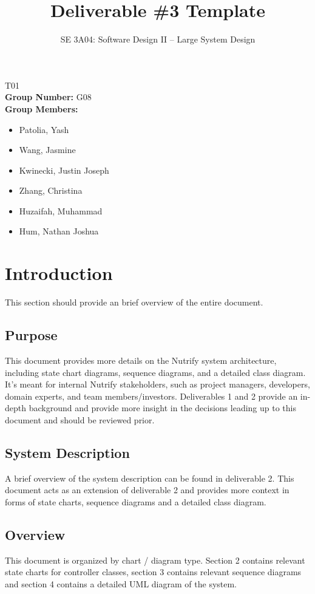 \documentclass[]{article}
\title{Deliverable \#3 Template}
\author{SE 3A04: Software Design II -- Large System Design}
\date{}
\numberwithin{figure}{section}
\begin{document}
\maketitle	
{} T01\\
{\bf Group Number:} G08 \\
{\bf Group Members:} 
\begin{itemize}
	\item Patolia, Yash
	\item Wang, Jasmine
	\item Kwinecki, Justin Joseph
	\item Zhang, Christina
	\item Huzaifah, Muhammad
	\item Hum, Nathan Joshua
\end{itemize}

\clearpage
\section{Introduction}
\label{sec:introduction}

This section should provide an brief overview of the entire document.

\subsection{Purpose}
\label{sub:purpose}
This document provides more details on the Nutrify system architecture, including state chart diagrams, sequence diagrams, and a detailed class diagram. It's meant for internal Nutrify stakeholders, such as project managers, developers, domain experts, and team members/investors.  Deliverables 1 and 2 provide an in-depth background and provide more insight in the decisions leading up to this document and should be reviewed prior.

\subsection{System Description}
\label{sub:system_description}
A brief overview of the system description can be found in deliverable 2. This document acts as an extension of deliverable 2 and provides more context in forms of state charts, sequence diagrams and a detailed class diagram.

\subsection{Overview}
\label{sub:overview}
This document is organized by chart / diagram type. Section 2 contains relevant state charts for controller classes, section 3 contains relevant sequence diagrams and section 4 contains a detailed UML diagram of the system.
\end{document}

